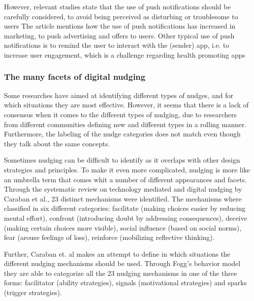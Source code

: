 

However, relevant studies state that the use of push notifications should be carefully considered, to avoid being perceived as disturbing or troublesome to users \cite{warren_push_2014}
The article mentions how the use of push notifications has increased in marketing, to push advertising and offers to users. Other typical use of push notifications is to remind the user to interact with the (sender) app, i.e. to increase user engagement, which is a challenge regarding health promoting apps \cite{bidargaddi_prompt_2018}

\subsubsection{The many facets of digital nudging}
Some researches have aimed at identifying different types of nudges, and for which situations they are most effective. However, it seems that there is a lack of consensus when it comes to the different types of nudging, due to researchers from different communities defining new and different types in a rolling manner. Furthermore, the labeling of the nudge categories does not match even though they talk about the same concepts. 

Sometimes nudging can be difficult to identify as it overlaps with other design strategies and principles. To make it even more complicated, nudging is more like an umbrella term that comes whit a number of different appearances and facets. Through the systematic review on technology mediated and digital nudging by Caraban et al.\cite{caraban_23_2019}, 23 distinct mechanisms were identified. The mechanisms where classified in six different categories: facilitate (making choices easier by reducing mental effort), confront (introducing doubt by addressing consequences), deceive (making certain choices more visible), social influence (based on social norms), fear (arouse feelings of loss), reinforce (mobilizing reflective thinking). 

Further, Caraban et. al \cite{caraban_23_2019} makes an attempt to define in which situations the different nudging mechanisms should be used. Through Fogg's behavior model they are able to categorize all the 23 nudging mechanisms in one of the three forms: facilitator (ability strategies), signals (motivational strategies) and sparks (trigger strategies).

